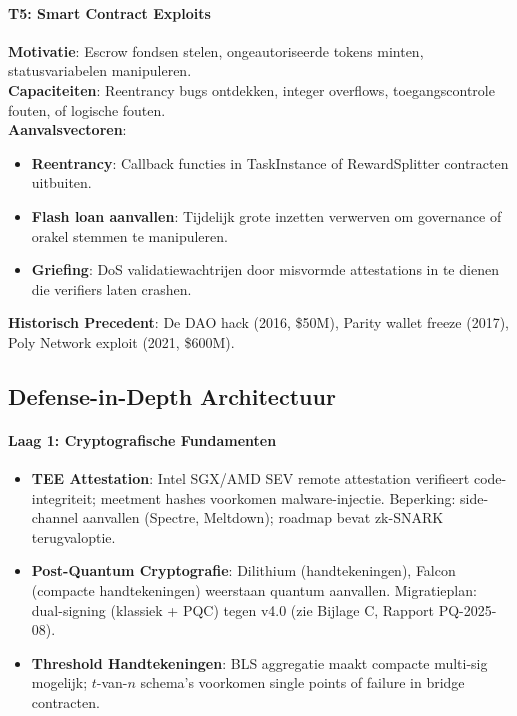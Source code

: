 \documentclass[11pt]{article}
\begin{document}
\paragraph{T5: Smart Contract Exploits}
\textbf{Motivatie}: Escrow fondsen stelen, ongeautoriseerde tokens minten, statusvariabelen manipuleren.\\
\textbf{Capaciteiten}: Reentrancy bugs ontdekken, integer overflows, toegangscontrole fouten, of logische fouten.\\
\textbf{Aanvalsvectoren}:
\begin{itemize}[noitemsep]
  \item \textbf{Reentrancy}: Callback functies in TaskInstance of RewardSplitter contracten uitbuiten.
  \item \textbf{Flash loan aanvallen}: Tijdelijk grote inzetten verwerven om governance of orakel stemmen te manipuleren.
  \item \textbf{Griefing}: DoS validatiewachtrijen door misvormde attestations in te dienen die verifiers laten crashen.
\end{itemize}
\textbf{Historisch Precedent}: De DAO hack (2016, \$50M), Parity wallet freeze (2017), Poly Network exploit (2021, \$600M).

\subsection{Defense-in-Depth Architectuur}

\paragraph{Laag 1: Cryptografische Fundamenten}
\begin{itemize}[noitemsep]
  \item \textbf{TEE Attestation}: Intel SGX/AMD SEV remote attestation verifieert code-integriteit; meetment hashes voorkomen malware-injectie. Beperking: side-channel aanvallen (Spectre, Meltdown); roadmap bevat zk-SNARK terugvaloptie.
  \item \textbf{Post-Quantum Cryptografie}: Dilithium (handtekeningen), Falcon (compacte handtekeningen) weerstaan quantum aanvallen. Migratieplan: dual-signing (klassiek + PQC) tegen v4.0 (zie Bijlage C, Rapport PQ-2025-08).
  \item \textbf{Threshold Handtekeningen}: BLS aggregatie maakt compacte multi-sig mogelijk; $t$-van-$n$ schema's voorkomen single points of failure in bridge contracten.
\end{itemize}
\end{document}
